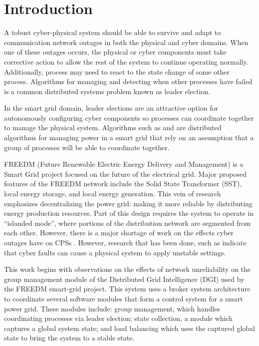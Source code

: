 \chapter{Introduction}
A tobust cyber-physical system should be able to survive and adapt to communication network outages in both the physical and cyber domains. When one of these outages occurs, the physical or cyber components must take corrective action to allow the rest of the system to continue operating normally. Additionally, process may need to react to the state change of some other process. Algorithms for managing and detecting when other processes have failed is a common distributed systems problem known as leader election.

In the smart grid domain, leader elections are an attractive option for autonomously configuring cyber components so processes can coordinate together to manage the physical system. Algorithms such as \cite{LOADBALANCING} and \cite{INCREMENTALCONSENSUS} are distributed algorithms for managing power in a smart grid that rely on an assumption that a group of processes will be able to coordinate together. 

FREEDM (Future Renewable Electric Energy Delivery and Management) is a Smart Grid project focused on the future of the electrical grid. Major proposed features of the FREEDM network include the Solid State Transformer (SST), local energy storage, and local energy generation\cite{FREEDMMIGRATION}. This vein of research emphasizes decentralizing the power grid: making it more reliable by distributing energy production resources. Part of this design requires the system to operate in “islanded mode”, where portions of the distribution network are segmented from each other. However, there is a major shortage of work on the effects cyber outages have on CPSs \cite{CYBERRESEARCHCALL} \cite{SMARTGRIDBENEFITS}. However, research that has been done, such as \cite{HARINI} indicate that cyber faults can cause a physical system to apply unstable settings.

This work begins with observations on the effects of network unreliability on the group management module of the Distributed Grid Intelligence (DGI) used by the FREEDM smart-grid project. This system uses a broker system architecture to coordinate several software modules that form a control system for a smart power grid. These modules include: group management, which handles coordinating processes via leader election; state collection, a module which captures a global system state; and load balancing which uses the captured global state to bring the system to a stable state.

